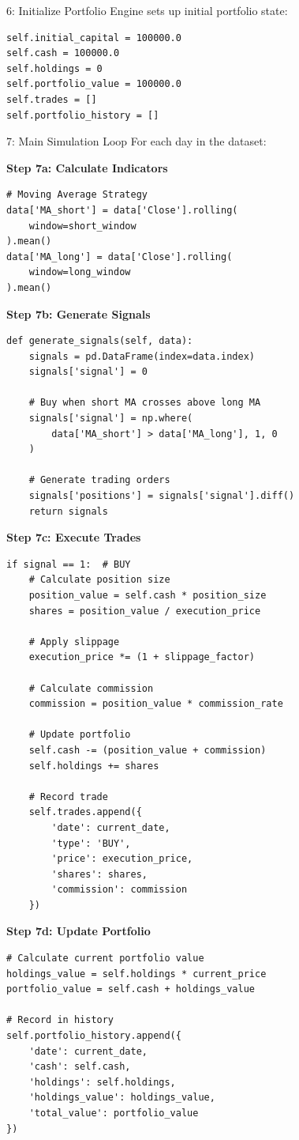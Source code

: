 \documentclass[11pt,a4paper]{article}
\begin{document}
\begin{flowstep}{6: Initialize Portfolio}
Engine sets up initial portfolio state:
\begin{lstlisting}[style=pythoncode]
self.initial_capital = 100000.0
self.cash = 100000.0
self.holdings = 0
self.portfolio_value = 100000.0
self.trades = []
self.portfolio_history = []
\end{lstlisting}
\end{flowstep}

\begin{flowstep}{7: Main Simulation Loop}
For each day in the dataset:

\textbf{Step 7a: Calculate Indicators}
\begin{lstlisting}[style=pythoncode]
# Moving Average Strategy
data['MA_short'] = data['Close'].rolling(
    window=short_window
).mean()
data['MA_long'] = data['Close'].rolling(
    window=long_window
).mean()
\end{lstlisting}

\textbf{Step 7b: Generate Signals}
\begin{lstlisting}[style=pythoncode]
def generate_signals(self, data):
    signals = pd.DataFrame(index=data.index)
    signals['signal'] = 0
    
    # Buy when short MA crosses above long MA
    signals['signal'] = np.where(
        data['MA_short'] > data['MA_long'], 1, 0
    )
    
    # Generate trading orders
    signals['positions'] = signals['signal'].diff()
    return signals
\end{lstlisting}

\textbf{Step 7c: Execute Trades}
\begin{lstlisting}[style=pythoncode]
if signal == 1:  # BUY
    # Calculate position size
    position_value = self.cash * position_size
    shares = position_value / execution_price
    
    # Apply slippage
    execution_price *= (1 + slippage_factor)
    
    # Calculate commission
    commission = position_value * commission_rate
    
    # Update portfolio
    self.cash -= (position_value + commission)
    self.holdings += shares
    
    # Record trade
    self.trades.append({
        'date': current_date,
        'type': 'BUY',
        'price': execution_price,
        'shares': shares,
        'commission': commission
    })
\end{lstlisting}

\textbf{Step 7d: Update Portfolio}
\begin{lstlisting}[style=pythoncode]
# Calculate current portfolio value
holdings_value = self.holdings * current_price
portfolio_value = self.cash + holdings_value

# Record in history
self.portfolio_history.append({
    'date': current_date,
    'cash': self.cash,
    'holdings': self.holdings,
    'holdings_value': holdings_value,
    'total_value': portfolio_value
})
\end{lstlisting}
\end{flowstep}
\end{document}
